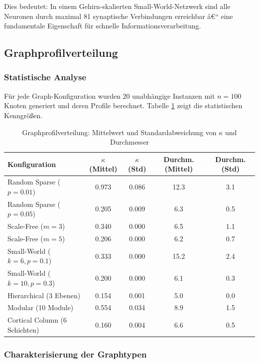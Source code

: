 ﻿\documentclass[a4paper,12pt]{article}
\theoremstyle{definition}
\begin{document}
	Dies bedeutet: In einem Gehirn-skalierten Small-World-Netzwerk sind alle Neuronen durch maximal 81 synaptische Verbindungen erreichbar â€“ eine fundamentale Eigenschaft für schnelle Informationsverarbeitung.
	
	\subsection{Graphprofilverteilung}
	
	\subsubsection{Statistische Analyse}
	
	Für jede Graph-Konfiguration wurden 20 unabhängige Instanzen mit $n = 100$ Knoten generiert und deren Profile berechnet. Tabelle \ref{tab:distribution} zeigt die statistischen Kenngrößen.
	
	\begin{table}[H]
		\centering
		\caption{Graphprofilverteilung: Mittelwert und Standardabweichung von $\kappa$ und Durchmesser}
		\label{tab:distribution}
		\small
		\begin{tabular}{lcccc}
			\hline
			\textbf{Konfiguration} & $\kappa$ (Mittel) & $\kappa$ (Std) & \textbf{Durchm.} (Mittel) & \textbf{Durchm.} (Std) \\
			\hline
			Random Sparse ($p=0.01$) & 0.973 & 0.086 & 12.3 & 3.1 \\
			Random Sparse ($p=0.05$) & 0.205 & 0.009 & 6.3 & 0.5 \\
			Scale-Free ($m=3$) & 0.340 & 0.000 & 6.5 & 1.1 \\
			Scale-Free ($m=5$) & 0.206 & 0.000 & 6.2 & 0.7 \\
			Small-World ($k=6, p=0.1$) & 0.333 & 0.000 & 15.2 & 2.4 \\
			Small-World ($k=10, p=0.3$) & 0.200 & 0.000 & 6.1 & 0.3 \\
			Hierarchical (3 Ebenen) & 0.154 & 0.001 & 5.0 & 0.0 \\
			Modular (10 Module) & 0.554 & 0.034 & 8.9 & 1.5 \\
			Cortical Column (6 Schichten) & 0.160 & 0.004 & 6.6 & 0.5 \\
			\hline
		\end{tabular}
	\end{table}
	
	\subsubsection{Charakterisierung der Graphtypen}
	
\end{document}
